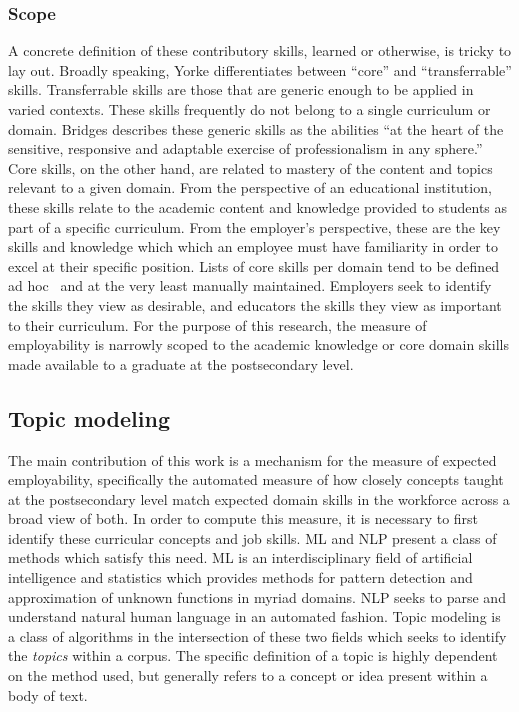 \subsubsection{Scope}

A concrete definition of these contributory skills, learned or otherwise, is tricky to lay out.
Broadly speaking, Yorke differentiates between ``core'' and ``transferrable'' skills.
Transferrable skills are those that are generic enough to be applied in varied contexts.
These skills frequently do not belong to a single curriculum or domain.
Bridges describes these generic skills as the abilities ``at the heart of the sensitive, responsive and adaptable exercise of professionalism in any sphere.''~\cite{bridges1993}
Core skills, on the other hand, are related to mastery of the content and topics relevant to a given domain.
From the perspective of an educational institution, these skills relate to the academic content and knowledge provided to students as part of a specific curriculum.
From the employer's perspective, these are the key skills and knowledge which which an employee must have familiarity in order to excel at their specific position.
Lists of core skills per domain tend to be defined ad hoc~\cite{wolf2002,yorke2006} and at the very least manually maintained.
Employers seek to identify the skills they view as desirable, and educators the skills they view as important to their curriculum.
For the purpose of this research, the measure of employability is narrowly scoped to the academic knowledge or core domain skills made available to a graduate at the postsecondary level.


\subsection{Topic modeling}

The main contribution of this work is a mechanism for the measure of expected employability, specifically the automated measure of how closely concepts taught at the postsecondary level match expected domain skills in the workforce across a broad view of both.
In order to compute this measure, it is necessary to first identify these curricular concepts and job skills.
ML and NLP present a class of methods which satisfy this need.
ML is an interdisciplinary field of artificial intelligence and statistics which provides methods for pattern detection and approximation of unknown functions in myriad domains.
NLP seeks to parse and understand natural human language in an automated fashion.
Topic modeling is a class of algorithms in the intersection of these two fields which seeks to identify the \textit{topics} within a corpus.
The specific definition of a topic is highly dependent on the method used, but generally refers to a concept or idea present within a body of text.


